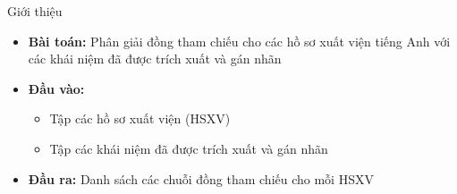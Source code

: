 \begin{frame}{Giới thiệu}
\putlogo
\begin{itemize}
	\item \textbf{Bài toán:} Phân giải đồng tham chiếu cho các hồ sơ xuất viện tiếng Anh với các khái niệm đã được trích xuất và gán nhãn
	\item \textbf{Đầu vào:}
	\begin{itemize}
		\item Tập các hồ sơ xuất viện (HSXV)
		\item Tập các khái niệm đã được trích xuất và gán nhãn
	\end{itemize}	
	\item \textbf{Đầu ra:} Danh sách các chuỗi đồng tham chiếu cho mỗi HSXV	
\end{itemize}

\end{frame}
